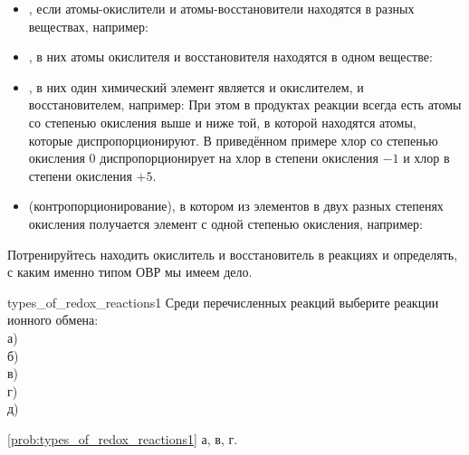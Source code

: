 \begin{itemize}
    \item {}, если атомы-окислители и атомы-восстановите\-ли находятся в разных веществах, например:
    \item {}, в них атомы окислителя и восстановителя находятся в одном веществе:
    \item {}, в них один химический элемент является и окислителем, и восстановителем, например:
    При этом в продуктах реакции всегда есть атомы со степенью окисления выше и ниже той, в которой находятся атомы, которые диспропорционируют. В приведённом примере хлор со степенью окисления 0 диспропорционирует на хлор в степени окисления $-1$ и хлор в степени окисления $+5$.
    \item {} (контропорционирование), в котором из элементов в двух разных степенях окисления получается элемент с одной степенью окисления, например:
\end{itemize}

Потренируйтесь находить окислитель и восстановитель в реакциях и определять, с каким именно типом ОВР мы имеем дело.

\begin{problem}{}{types_of_redox_reactions1}
    Среди перечисленных реакций выберите реакции ионного обмена:\\
    а) \\
    б) \\
    в) \\
    г) \\
    д) 
    \begin{sol}{\ref{prob:types_of_redox_reactions1}}
        а, в, г.
    \end{sol}
\end{problem}

